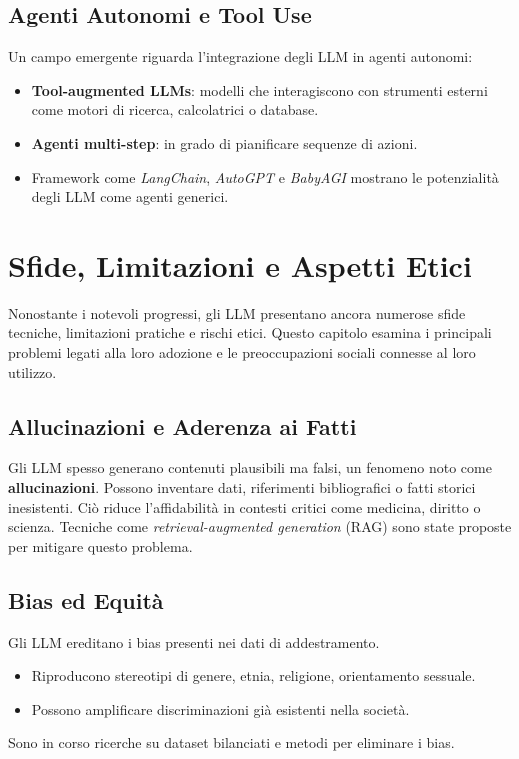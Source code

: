 \subsection{Agenti Autonomi e Tool Use}
Un campo emergente riguarda l'integrazione degli LLM in agenti autonomi:
\begin{itemize}
    \item \textbf{Tool-augmented LLMs}: modelli che interagiscono con strumenti esterni 
    come motori di ricerca, calcolatrici o database.
    \item \textbf{Agenti multi-step}: in grado di pianificare sequenze di azioni.
    \item Framework come \textit{LangChain}, \textit{AutoGPT} e \textit{BabyAGI} mostrano 
    le potenzialità degli LLM come agenti generici.
\end{itemize}

\newpage
\section{Sfide, Limitazioni e Aspetti Etici}

Nonostante i notevoli progressi, gli LLM presentano ancora
numerose sfide tecniche, limitazioni pratiche e rischi etici.
Questo capitolo esamina i principali problemi legati alla loro adozione
e le preoccupazioni sociali connesse al loro utilizzo.

\subsection{Allucinazioni e Aderenza ai Fatti}
Gli LLM spesso generano contenuti plausibili ma falsi, un fenomeno noto come \textbf{allucinazioni}.
Possono inventare dati, riferimenti bibliografici o fatti storici inesistenti. Ciò riduce l'affidabilità in contesti critici 
come medicina, diritto o scienza. Tecniche come \textit{\textit{retrieval-augmented generation}} (RAG) sono state proposte per mitigare questo problema.

\subsection{Bias ed Equità}
Gli LLM ereditano i bias presenti nei dati di addestramento.
\begin{itemize}
    \item Riproducono stereotipi di genere, etnia, religione, orientamento sessuale.
    \item Possono amplificare discriminazioni già esistenti nella società.
\end{itemize}
Sono in corso ricerche su dataset bilanciati e metodi per eliminare i bias.

